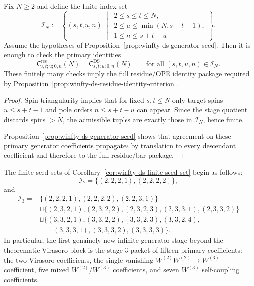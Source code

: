 \begin{corollary}
\label{cor:winfty-ds-finite-seed-set}
Fix $N \ge 2$ and define the finite index set
\[
\mathcal{I}_N:=
\left\{
(s,t,u,n)\ \middle|\
\begin{array}{l}
2 \le s \le t \le N,\\
2 \le u \le \min(N,s+t-1),\\
1 \le n \le s+t-u
\end{array}
\right\}.
\]
Assume the hypotheses of
Proposition~\ref{prop:winfty-ds-generator-seed}.  Then it is enough to
check the primary identities
\[
\mathsf{C}^{\mathrm{res}}_{s,t;u;0,n}(N)
=\mathsf{C}^{\mathrm{DS}}_{s,t;u;0,n}(N)
\qquad\text{for all } (s,t,u,n)\in\mathcal{I}_N.
\]
These finitely many checks imply the full residue/OPE identity package
required by
Proposition~\ref{prop:winfty-ds-residue-identity-criterion}.
\end{corollary}

\begin{proof}
Spin-triangularity implies that for fixed $s,t \le N$ only target spins
$u \le s+t-1$ and pole orders $n \le s+t-u$ can appear.  Since the
stage quotient discards spins $>N$, the admissible tuples are exactly
those in $\mathcal{I}_N$, hence finite.

Proposition~\ref{prop:winfty-ds-generator-seed} shows that agreement on
these primary generator coefficients propagates by translation to every
descendant coefficient and therefore to the full residue/bar package.
\end{proof}

\begin{corollary}
\label{cor:winfty-ds-lowstage-seeds}
The finite seed sets of
Corollary~\ref{cor:winfty-ds-finite-seed-set} begin as follows:
\[
\mathcal{I}_2
=\{(2,2,2,1),(2,2,2,2)\},
\]
and
\begin{align*}
\mathcal{I}_3
= {} & \{(2,2,2,1),(2,2,2,2),(2,2,3,1)\} \\
& \sqcup\{(2,3,2,1),(2,3,2,2),(2,3,2,3),(2,3,3,1),(2,3,3,2)\} \\
& \sqcup\{(3,3,2,1),(3,3,2,2),(3,3,2,3),(3,3,2,4), \\
& \qquad (3,3,3,1),(3,3,3,2),(3,3,3,3)\}.
\end{align*}
In particular, the first genuinely new infinite-generator stage beyond
the theorematic Virasoro block is the stage-$3$ packet of fifteen
primary coefficients: the two Virasoro coefficients, the single
vanishing $W^{(2)}W^{(2)}\to W^{(3)}$ coefficient, five mixed
$W^{(2)}$/$W^{(3)}$ coefficients, and seven $W^{(3)}$ self-coupling
coefficients.
\end{corollary}

